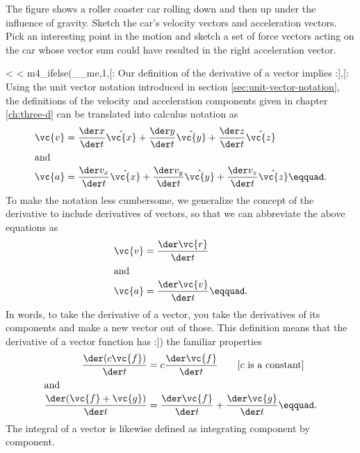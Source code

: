 \begin{dq}\label{dq:roller-coaster-mechanics}
The figure shows a roller coaster car rolling down and
then up under the influence of gravity. Sketch the car's
velocity vectors and acceleration vectors. Pick an
interesting point in the motion and sketch a set of force
vectors acting on the car whose vector sum could have
resulted in the right acceleration vector.
\end{dq}


<%
<%
m4_ifelse(__me,1,[:
Our definition of the  derivative of a vector implies
:],[:
Using the unit vector notation introduced in section
\ref{sec:unit-vector-notation}, the definitions of the velocity and acceleration components
given in chapter \ref{ch:three-d} can be translated into calculus notation as
\begin{align*}
     \vc{v} &= \frac{\der x}{\der t} \hat{\vc{x}} + \frac{\der y}{\der t} \hat{\vc{y}} + \frac{\der z}{\der t} \hat{\vc{z}}\\
\intertext{and}
     \vc{a} &= \frac{\der v_x}{\der t} \hat{\vc{x}} + \frac{\der v_y}{\der t} \hat{\vc{y}} + \frac{\der v_z}{\der t} \hat{\vc{z}}\eqquad. 
\end{align*}
To make the notation less cumbersome, we generalize the
concept of the derivative to include derivatives of vectors,
so that we can abbreviate the above equations as
\begin{align*}
  \vc{v} &= \frac{\der \vc{r}}{\der t} \\
\intertext{and}
  \vc{a} &= \frac{\der \vc{v}}{\der t}\eqquad.
\end{align*}
In words, to take the derivative of a vector, you take the
derivatives of its components and make a new vector out of
those.
This definition means that the derivative of a vector
function has 
:])%
the familiar properties
\begin{align*}
  \frac{\der(c\vc{f})}{\der t} &= c \frac{\der\vc{f}}{\der t} \qquad \shoveright{\text{[$c$ is a constant]}} \\
\intertext{and}
  \frac{\der(\vc{f}+\vc{g})}{\der t} &=  \frac{\der\vc{f}}{\der t}  +  \frac{\der\vc{g}}{\der t}\eqquad.
\end{align*}
The integral of a vector is likewise defined as integrating
component by component.

